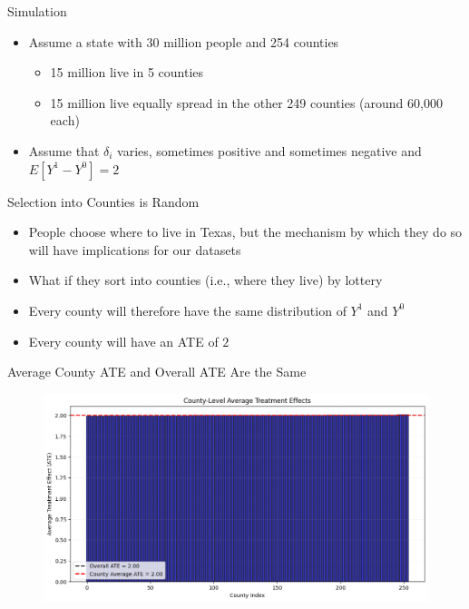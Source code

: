 \documentclass{beamer}
\begin{document}
\begin{frame}{Simulation}

\begin{itemize}
\item Assume a state with 30 million people and 254 counties
	\begin{itemize}
	\item 15 million live in 5 counties
	\item 15 million live equally spread in the other 249 counties (around 60,000 each)
	\end{itemize}
\item Assume that $\delta_i$ varies, sometimes positive and sometimes negative and $E[Y^1 - Y^0] = 2$
\end{itemize}

\end{frame}

\begin{frame}{Selection into Counties is Random}

\begin{itemize}
\item People choose where to live in Texas, but the mechanism by which they do so will have implications for our datasets
\item What if they sort into counties (i.e., where they live) by lottery
\item Every county will therefore have the same distribution of $Y^1$ and $Y^0$
\item Every county will have an ATE of $2$
\end{itemize}

\end{frame}


\begin{frame}{Average County ATE and Overall ATE Are the Same }

\begin{figure}
    \centering
    \includegraphics[height=0.7\textheight]{./lecture_includes/tiebout_roy1}
\end{figure}

\end{frame}
\end{document}
